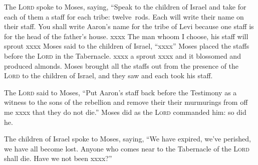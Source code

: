 \begin{inparaenum}
   The \textsc{Lord} spoke to Moses, saying,%
   ``Speak to the children of Israel and take for each of them a staff for each tribe: twelve~rods. Each will write their name on their staff.%
   You shall write Aaron's name for the tribe of Levi because one staff is for the head of the father's house.%
   xxxx%
   The man whoom I choose, his staff will sprout xxxx%
   Moses said to the children of Israel, ``xxxx''%
   Moses placed the staffs before the \textsc{Lord} in the Tabernacle.%
   xxxx a sprout xxxx and it blossomed and produced almonds.%
   Moses brought all the staffs out from the presence of the \textsc{Lord} to the children of Israel, and they saw and each took his staff.%
  
   The \textsc{Lord} said to Moses, ``Put Aaron's staff back before the Testimony as a witness to the sons of the rebellion and remove their their murmurings from off me xxxx that they do not die.''%
   Moses did as the \textsc{Lord} commanded him: so did he.%
  
   The children of Israel spoke to Moses, saying, ``We have expired, we've perished, we have all become lost.%
   Anyone who comes near to the Tabernacle of the \textsc{Lord} shall die. Have we not been xxxx?''%
\end{inparaenum}
